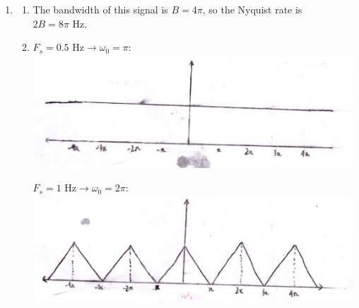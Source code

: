 \documentclass[12pt]{article}
\begin{document}
\begin{enumerate}
      \item \begin{enumerate}
                  \item The bandwidth of this signal is $B=4\pi$, so the Nyquist rate is $2B=\boxed{8\pi\text{ Hz}}$.
                  \item $F_s=0.5\text{ Hz} \rightarrow \omega_0=\pi$: \\
                        \includegraphics[width=12cm]{img/hw7/half_hertz}

                        $F_s=1\text{ Hz} \rightarrow \omega_0=2\pi$: \\
                        \includegraphics[width=12cm]{img/hw7/one_hertz}


\end{enumerate}
\end{enumerate}
\end{document}
